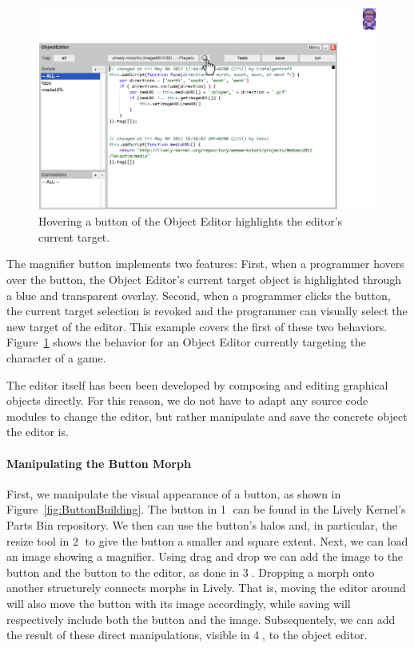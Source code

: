 \begin{figure}[h]
    \centering
    \includegraphics[width=\textwidth]{figures/3_motivation/2_magnifierBehavior.png}
    \caption{Hovering a button of the Object Editor highlights the editor's current target.}
    \label{fig:MagnifierBehavior}
\end{figure}

The magnifier button implements two features: First, when a programmer hovers over the button, the Object Editor's current target object is highlighted through a blue and transparent overlay. Second, when a programmer clicks the button, the current target selection is revoked and the programmer can visually select the new target of the editor.
This example covers the first of these two behaviors.
Figure~\ref{fig:MagnifierBehavior} shows the behavior for an Object Editor currently targeting the character of a game.

The editor itself has been been developed by composing and editing graphical objects directly.
For this reason, we do not have to adapt any source code modules to change the editor, but rather manipulate and save the concrete object the editor is.

\paragraph{Manipulating the Button Morph}
First, we manipulate the visual appearance of a button, as shown in Figure~\ref{fig:ButtonBuilding}.
The button in \textcircled{1} can be found in the Lively Kernel's Parts Bin repository.
We then can use the button's halos and, in particular, the resize tool in \textcircled{2} to give the button a smaller and square extent.
Next, we can load an image showing a magnifier.
Using drag and drop we can add the image to the button and the button to the editor, as done in \textcircled{3}.
Dropping a morph onto another structurely connects morphs in Lively.
That is, moving the editor around will also move the button with its image accordingly, while saving will respectively include both the button and the image.
Subsequentely, we can add the result of these direct manipulations, visible in \textcircled{4}, to the object editor.

